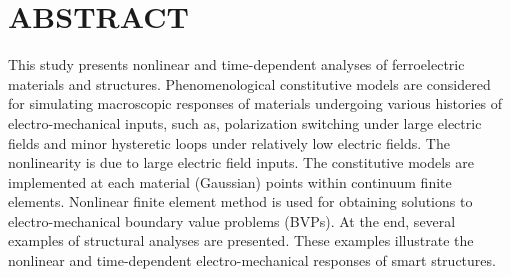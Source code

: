 %
%
%

\chapter*{ABSTRACT}

\pagestyle{plain} %
\setcounter{page}{2}

\indent 
This study presents nonlinear and time-dependent analyses of ferroelectric materials and structures.
Phenomenological constitutive models are considered for simulating macroscopic responses of materials undergoing various histories of electro-mechanical inputs,
such as, polarization switching under large electric fields and minor hysteretic loops under relatively low electric fields.  
The nonlinearity is due to large electric field inputs.
The constitutive models are implemented at each material (Gaussian) points within continuum finite elements. 
Nonlinear finite element method is used for obtaining solutions to electro-mechanical boundary value problems (BVPs). 
At the end, several examples of structural analyses are presented.
These examples illustrate the nonlinear and time-dependent electro-mechanical responses of smart structures.


\pagebreak{}

